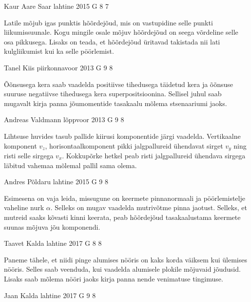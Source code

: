 \documentclass[11pt]{article}
\begin{document}
{%
{Kaur Aare Saar} %
{lahtine} %
{2015} %
{G 8} %
{7} %
{

\ifHint
Latile mõjub igas punktis hõõrdejõud, mis on vastupidine selle punkti liikumissuunale. Kogu mingile osale mõjuv hõõrdejõud on seega võrdeline selle osa pikkusega. Lisaks on teada, et hõõrdejõud üritavad takistada nii lati kulgliikumist kui ka selle pöörlemist.
\fi
}

{Tanel Kiis} %
{piirkonnavoor} %
{2013} %
{G 9} %
{8} %
{

\ifHint
Õõnsusega kera saab vaadelda positiivse tihedusega täidetud kera ja õõnsuse suuruse negatiivse tihedusega kera superpositsioonina. Sellisel juhul saab mugavalt kirja panna jõumomentide tasakaalu mõlema stsenaariumi jaoks.
\fi
}

{Andreas Valdmann} %
{lõppvoor} %
{2013} %
{G 9} %
{8} %
{

\ifHint
Lihtsuse huvides tasub pallide kiirusi komponentide järgi vaadelda. Vertikaalne komponent $v_z$, horisontaalkomponent pikki jalgpallureid ühendavat sirget $v_y$ ning risti selle sirgega $v_x$. Kokkupõrke hetkel peab risti jalgpallureid ühendava sirgega läbitud vahemaa mõlemal pallil sama olema.
\fi
}

{Andres Põldaru} %
{lahtine} %
{2015} %
{G 9} %
{8} %
{

\ifHint
Esimesena on vaja leida, missugune on keermete pinnanormaali ja pöörlemistelje vaheline nurk $\alpha$. Selleks on mugav vaadelda mutrivõtme pinna jaotust. Selleks, et mutreid saaks kõvasti kinni keerata, peab hõõrdejõud tasakaalustama keermete suunas mõjuva jõu komponendi.
\fi
}

{Taavet Kalda} %
{lahtine} %
{2017} %
{G 8} %
{8} %
{

\ifHint
Paneme tähele, et niidi pinge alumises nööris on kaks korda väiksem kui ülemises nööris. Selles saab veenduda, kui vaadelda alumisele plokile mõjuvaid jõudusid. Lisaks saab mõlema nööri jaoks kirja panna nende venimatuse tingimuse.
\fi
}

{Jaan Kalda} %
{lahtine} %
{2017} %
{G 9} %
{8} %
{

}}
\end{document}
